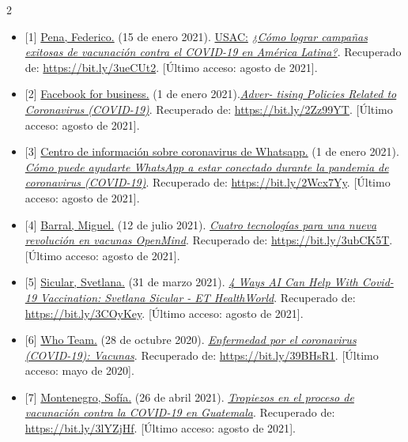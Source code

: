 \documentclass[12pt,spanish,Letterpaper,openany]{book}
\begin{document}
\begin {multicols}{2}
\begin{itemize}
\item
  {[}1{]} \href{https://www.caf.com}{Pena, Federico.} (15 de enero 2021). \href{https://www.usac.edu.gt/}{USAC:} \href{https://www.caf.com/es/conocimiento/visiones/2021/01/como-lograr-campanas-exitosas-de-vacunacion-contra-el-covid19-en-america-latina/}{\emph{¿Cómo lograr campañas exitosas de vacunación contra el COVID-19 en América Latina?}}. Recuperado de: \url{https://bit.ly/3ueCUt2}. {[}Último acceso: agosto de 2021{]}.
\item
  {[}2{]} \href{http://www.repositorio.usac.edu.gt/}{Facebook for business.} (1 de enero 2021).\href{https://www.facebook.com/business/help/1123969894625935}{\emph{Adver- tising Policies Related to Coronavirus (COVID-19)}}. Recuperado de: \url{https://bit.ly/2Zz99YT}. {[}Último acceso: agosto de 2021{]}.
\item
  {[}3{]} \href{https://www.whatsapp.com}{Centro de información sobre coronavirus de Whatsapp.} (1 de enero 2021). \href{https://www.whatsapp.com/coronavirus/?lang=es}{\emph{Cómo puede ayudarte WhatsApp a estar conectado durante la pandemia de coronavirus (COVID-19)}}. Recuperado de: \url{https://bit.ly/2Wcx7Yy}. {[}Último acceso: agosto de 2021{]}.
\item
  {[}4{]} \href{https://www.bbvaopenmind.com}{Barral, Miguel.} (12 de julio 2021). \href{https://www.bbvaopenmind.com/ciencia/apuntes-cientificos/tecnologias\%02nueva-revolucion-en-vacunas/}{\emph{Cuatro tecnologías para una nueva revolución en vacunas \textbar{} OpenMind}}. Recuperado de: \url{https://bit.ly/3ubCK5T}. {[}Último acceso: agosto de 2021{]}.
\item
  {[}5{]} \href{https://health.economictimes.indiatimes.com}{Sicular, Svetlana.} (31 de marzo 2021). \href{https://health.economictimes.indiatimes.com/news/health-it/4-ways-ai-can-help-with-covid-19-vaccination-svetlana-sicular/81782358}{\emph{4 Ways AI Can Help With Covid-19 Vaccination: Svetlana Sicular - ET HealthWorld}}. Recuperado de: \url{https://bit.ly/3COyKey}. {[}Último acceso: agosto de 2021{]}.
\item
  {[}6{]} \href{http://www.repositorio.usac.edu.gt/4300/}{Who Team.} (28 de octubre 2020). \href{https://www.who.int/es/news-room/q-a-detail/coronavirus-disease-(covid-19)-vaccines?adgroupsurvey=\%7Badgroupsurvey\%7D\&gclid=Cj0KCQjwpreJBhDvA}{\emph{Enfermedad por el coronavirus (COVID-19): Vacunas}}. Recuperado de: \url{https://bit.ly/39BHsR1}. {[}Último acceso: mayo de 2020{]}.
\item
  {[}7{]} \href{http://www.repositorio.usac.edu.gt/4300/}{Montenegro, Sofía.} (26 de abril 2021). \href{https://dialogos.org.gt/blog/tropiezos-en-el-proceso-de-vacunacion-contra-la-covid-19-en-guatemala}{\emph{Tropiezos en el proceso de vacunación contra la COVID-19 en Guatemala}}. Recuperado de: \url{https://bit.ly/3lYZjHf}. {[}Último acceso: agosto de 2021{]}.
\end{itemize}

\end {multicols}
\end{document}
